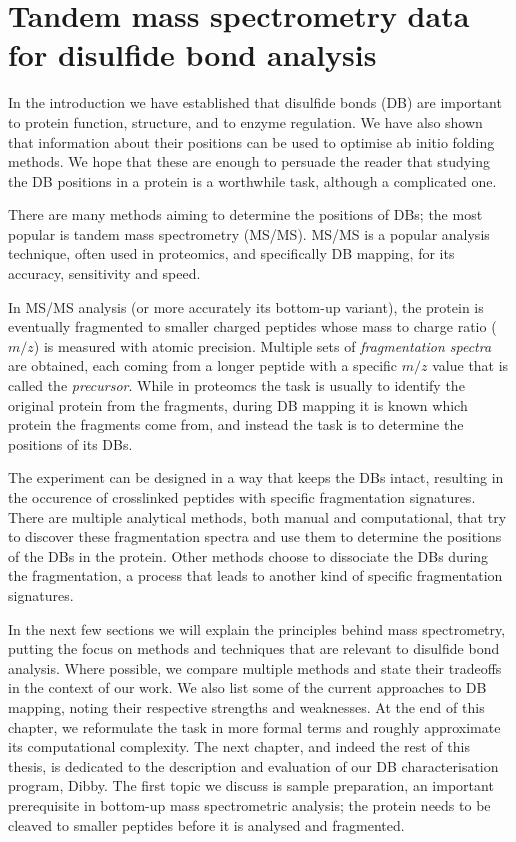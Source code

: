 \chapter{Tandem mass spectrometry data for disulfide bond analysis}

In the introduction we have established that disulfide bonds (DB) are important to protein function, structure, and to enzyme regulation. We have also shown that information about their positions can be used to optimise ab initio folding methods. We hope that these are enough to persuade the reader that studying the DB positions in a protein is a worthwhile task, although a complicated one.

There are many methods aiming to determine the positions of DBs; the most popular is tandem mass spectrometry (MS/MS). MS/MS is a popular analysis technique, often used in proteomics, and specifically DB mapping, for its accuracy, sensitivity and speed.~\cite{gorman2002protein}

In MS/MS analysis (or more accurately its bottom-up variant), the protein is eventually fragmented to smaller charged peptides whose mass to charge ratio (\(m/z\)) is measured with atomic precision. Multiple sets of \emph{fragmentation spectra} are obtained, each coming from a longer peptide with a specific \(m/z\) value that is called the \emph{precursor}. While in proteomcs the task is usually to identify the original protein from the fragments, during DB mapping it is known which protein the fragments come from, and instead the task is to determine the positions of its DBs.

The experiment can be designed in a way that keeps the DBs intact, resulting in the occurence of crosslinked peptides with specific fragmentation signatures. There are multiple analytical methods, both manual and computational, that try to discover these fragmentation spectra and use them to determine the positions of the DBs in the protein. Other methods choose to dissociate the DBs during the fragmentation, a process that leads to another kind of specific fragmentation signatures.

In the next few sections we will explain the principles behind mass spectrometry, putting the focus on methods and techniques that are relevant to disulfide bond analysis. Where possible, we compare multiple methods and state their tradeoffs in the context of our work. We also list some of the current approaches to DB mapping, noting their respective strengths and weaknesses. At the end of this chapter, we reformulate the task in more formal terms and roughly approximate its computational complexity. The next chapter, and indeed the rest of this thesis, is dedicated to the description and evaluation of our DB characterisation program, Dibby. The first topic we discuss is sample preparation, an important prerequisite in bottom-up mass spectrometric analysis; the protein needs to be cleaved to smaller peptides before it is analysed and fragmented.


